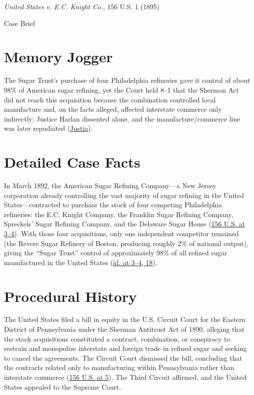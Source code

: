 \documentclass[12pt]{article}
\begin{document}
\begin{center}
{\LARGE \textit{United States v. E.C. Knight Co.}, 156 U.S. 1 (1895)\par}
\vspace{0.8em}
{\large Case Brief\par}
\end{center}
\vspace{1em}

\section{Memory Jogger}
The Sugar Trust's purchase of four Philadelphia refineries gave it control of about 98\% of American sugar refining, yet the Court held 8--1 that the Sherman Act did not reach this acquisition because the combination controlled local manufacture and, on the facts alleged, affected interstate commerce only indirectly; Justice Harlan dissented alone, and the manufacture/commerce line was later repudiated (\href{https://supreme.justia.com/cases/federal/us/156/1/}{Justia}).

\section{Detailed Case Facts}
In March 1892, the American Sugar Refining Company---a New Jersey corporation already controlling the vast majority of sugar refining in the United States---contracted to purchase the stock of four competing Philadelphia refineries: the E.C. Knight Company, the Franklin Sugar Refining Company, Spreckels' Sugar Refining Company, and the Delaware Sugar House (\href{https://supreme.justia.com/cases/federal/us/156/1/}{156 U.S. at 3--4}). With those four acquisitions, only one independent competitor remained (the Revere Sugar Refinery of Boston, producing roughly 2\% of national output), giving the ``Sugar Trust'' control of approximately 98\% of all refined sugar manufactured in the United States (\href{https://www.law.cornell.edu/supremecourt/text/156/1}{id. at 3--4, 18}).

\section{Procedural History}
The United States filed a bill in equity in the U.S. Circuit Court for the Eastern District of Pennsylvania under the Sherman Antitrust Act of 1890, alleging that the stock acquisitions constituted a contract, combination, or conspiracy to restrain and monopolize interstate and foreign trade in refined sugar and seeking to cancel the agreements. The Circuit Court dismissed the bill, concluding that the contracts related only to manufacturing within Pennsylvania rather than interstate commerce (\href{https://www.law.cornell.edu/supremecourt/text/156/1}{156 U.S. at 5}). The Third Circuit affirmed, and the United States appealed to the Supreme Court.
\end{document}

